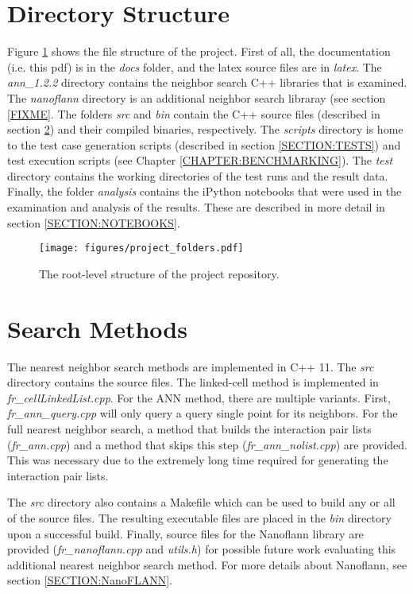 \section{Directory Structure}
Figure \ref{FIG:folders} shows the file structure of the project.  First of all, the documentation (i.e.  this pdf) is in the {\itshape docs} folder, and the latex source files are in {\itshape latex}. The {\itshape ann\_1.2.2} directory contains the neighbor search C++ libraries that is examined. The {\itshape nanoflann} directory is an additional neighbor search libraray (see section \ref{FIXME}.  The folders {\itshape src} and {\itshape bin} contain the C++ source files (described in section \ref{SECTION:SRC}) and their compiled binaries, respectively.  The {\itshape scripts} directory is home to the test case generation scripts (described in section \ref{SECTION:TESTS}) and test execution scripts (see Chapter \ref{CHAPTER:BENCHMARKING}).  The {\itshape test} directory contains the working directories of the test runs and the result data.   Finally, the folder {\itshape analysis} contains the iPython notebooks that were used in the examination and analysis of the results.  These are described in more detail in section \ref{SECTION:NOTEBOOKS}.

\begin{figure}[h]
	\centering
	\texttt{[image: figures/project\_folders.pdf]}
	\caption{The root-level structure of the project repository.}
      \label{FIG:folders}
\end{figure}

\section{Search Methods}
\label{SECTION:SRC}

The nearest neighbor search methods are implemented in C++ 11. The {\itshape src} directory contains the source files. The linked-cell method is implemented in {\itshape fr\_cellLinkedList.cpp}. For the ANN method, there are multiple variants. First, {\itshape fr\_ann\_query.cpp} will only query a query single point for its neighbors. For the full nearest neighbor search, a method that builds the interaction pair lists ({\itshape fr\_ann.cpp}) and a method that skips this step ({\itshape fr\_ann\_nolist.cpp}) are provided. This was necessary due to the extremely long time required for generating the interaction pair lists.

The {\itshape src} directory also contains a Makefile which can be used to build any or all of the source files. The resulting executable files are placed in the {\itshape bin} directory upon a successful build. Finally, source files for the Nanoflann library are provided ({\itshape fr\_nanoflann.cpp} and {\itshape utils.h}) for possible future work evaluating this additional  nearest neighbor search method. For more details about Nanoflann, see section \ref{SECTION:NanoFLANN}.

